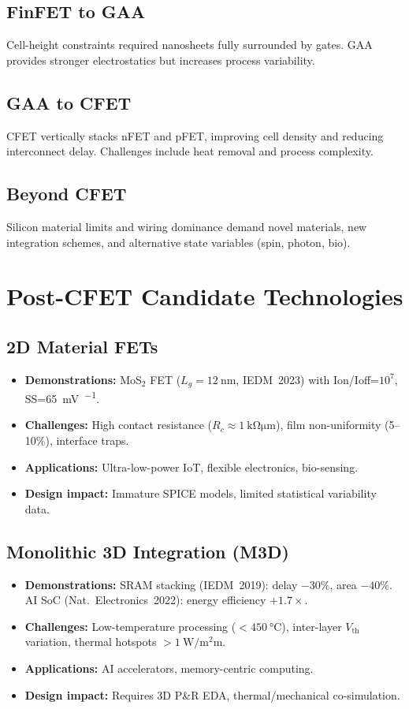 \documentclass[conference]{IEEEtran}
\begin{document}
\subsection{FinFET to GAA}
Cell-height constraints required nanosheets fully surrounded by gates. GAA provides stronger electrostatics but increases process variability.

\subsection{GAA to CFET}
CFET vertically stacks nFET and pFET, improving cell density and reducing interconnect delay. Challenges include heat removal and process complexity.

\subsection{Beyond CFET}
Silicon material limits and wiring dominance demand novel materials, new integration schemes, and alternative state variables (spin, photon, bio).

\section{Post-CFET Candidate Technologies}

\subsection{2D Material FETs}
\begin{itemize}
  \item \textbf{Demonstrations:} MoS$_2$ FET ($L_g=\SI{12}{\nano\meter}$, IEDM~2023) with Ion/Ioff=$10^7$, SS=\SI{65}{\milli\volt\per\decade}.
  \item \textbf{Challenges:} High contact resistance ($R_c \approx \SI{1}{\kilo\ohm\micro\meter}$), film non-uniformity (5--10\%), interface traps.
  \item \textbf{Applications:} Ultra-low-power IoT, flexible electronics, bio-sensing.
  \item \textbf{Design impact:} Immature SPICE models, limited statistical variability data.
\end{itemize}

\subsection{Monolithic 3D Integration (M3D)}
\begin{itemize}
  \item \textbf{Demonstrations:} SRAM stacking (IEDM~2019): delay $-30\%$, area $-40\%$. AI SoC (Nat.~Electronics~2022): energy efficiency $+1.7\times$.
  \item \textbf{Challenges:} Low-temperature processing ($<\SI{450}{\celsius}$), inter-layer $V_\mathrm{th}$ variation, thermal hotspots $>\SI{1}{\watt\per\square\milli\meter}$.
  \item \textbf{Applications:} AI accelerators, memory-centric computing.
  \item \textbf{Design impact:} Requires 3D P\&R EDA, thermal/mechanical co-simulation.
\end{itemize}
\end{document}
